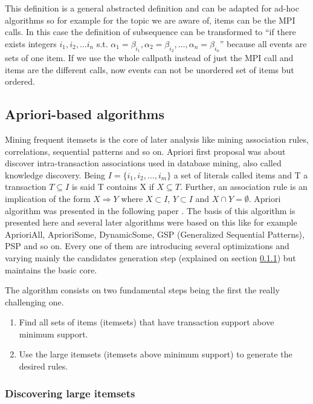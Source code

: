 This definition is a general abstracted definition and can be adapted for
ad-hoc algorithms so for example for the topic we are aware of, items can be the
MPI calls. In this case the
definition of subsequence can be transformed to “if there exists integers 
$i_{1}, i_{2}, \dots i_{n}$ s.t. $\alpha_{1} = \beta_{i_{1}}, 
\alpha_{2} = \beta_{i_{2}}, \dots, \alpha_{n} = \beta_{i_{n}}$” because all
events are sets of one item. If we use the whole callpath instead of just the
MPI call and items are the different calls, now events can not be unordered set
of items but ordered. 

\subsection{Apriori-based algorithms}

Mining frequent itemsets is the core of later analysis like mining association
rules, correlations, sequential patterns and so on. Apriori first proposal was
about discover intra-transaction associations used
in database mining, also called knowledge discovery.
Being $I=\{i_{1}, i_{2}, \dots,i_{m}\}$ a set of literals called items and T a
transaction $T \subseteq I$ is said T contains X if $X \subseteq T$. Further, an
association rule is an implication of the form $X \Rightarrow Y$ where $X
\subset I$, $Y \subset I$ and $X \cap Y = \emptyset$. Apriori algorithm was
presented in the following paper \cite{agrawalfast}. The basis of this algorithm
is presented here and several later algorithms were based on this like for
example AprioriAll, AprioriSome, DynamicSome, GSP (Generalized Sequential
Patterns), PSP and so on. Every one of them are introducing several
optimizations and varying mainly the candidates generation step (explained on
section \ref{ss:discovering_large_itemsets}) but maintains 
the basic core.

The algorithm consists on two fundamental steps being the first the really
challenging one.
\begin{enumerate}
  \item Find all sets of items (itemsets) that have transaction support above
    minimum support.
  \item Use the large itemsets (itemsets above minimum support) to generate the
    desired rules.
\end{enumerate}

\subsubsection{Discovering large itemsets}\label{ss:discovering_large_itemsets}

